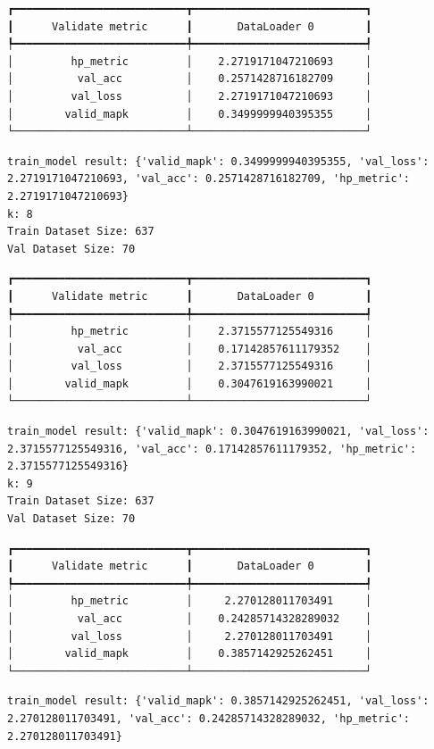 \documentclass[
  letterpaper,
  DIV=11,
  numbers=noendperiod]{scrreprt}
\begin{document}
\begin{verbatim}
┏━━━━━━━━━━━━━━━━━━━━━━━━━━━┳━━━━━━━━━━━━━━━━━━━━━━━━━━━┓
┃      Validate metric      ┃       DataLoader 0        ┃
┡━━━━━━━━━━━━━━━━━━━━━━━━━━━╇━━━━━━━━━━━━━━━━━━━━━━━━━━━┩
│         hp_metric         │    2.2719171047210693     │
│          val_acc          │    0.2571428716182709     │
│         val_loss          │    2.2719171047210693     │
│        valid_mapk         │    0.3499999940395355     │
└───────────────────────────┴───────────────────────────┘
\end{verbatim}

\begin{verbatim}
train_model result: {'valid_mapk': 0.3499999940395355, 'val_loss': 2.2719171047210693, 'val_acc': 0.2571428716182709, 'hp_metric': 2.2719171047210693}
k: 8
Train Dataset Size: 637
Val Dataset Size: 70
\end{verbatim}

\begin{verbatim}
┏━━━━━━━━━━━━━━━━━━━━━━━━━━━┳━━━━━━━━━━━━━━━━━━━━━━━━━━━┓
┃      Validate metric      ┃       DataLoader 0        ┃
┡━━━━━━━━━━━━━━━━━━━━━━━━━━━╇━━━━━━━━━━━━━━━━━━━━━━━━━━━┩
│         hp_metric         │    2.3715577125549316     │
│          val_acc          │    0.17142857611179352    │
│         val_loss          │    2.3715577125549316     │
│        valid_mapk         │    0.3047619163990021     │
└───────────────────────────┴───────────────────────────┘
\end{verbatim}

\begin{verbatim}
train_model result: {'valid_mapk': 0.3047619163990021, 'val_loss': 2.3715577125549316, 'val_acc': 0.17142857611179352, 'hp_metric': 2.3715577125549316}
k: 9
Train Dataset Size: 637
Val Dataset Size: 70
\end{verbatim}

\begin{verbatim}
┏━━━━━━━━━━━━━━━━━━━━━━━━━━━┳━━━━━━━━━━━━━━━━━━━━━━━━━━━┓
┃      Validate metric      ┃       DataLoader 0        ┃
┡━━━━━━━━━━━━━━━━━━━━━━━━━━━╇━━━━━━━━━━━━━━━━━━━━━━━━━━━┩
│         hp_metric         │     2.270128011703491     │
│          val_acc          │    0.24285714328289032    │
│         val_loss          │     2.270128011703491     │
│        valid_mapk         │    0.3857142925262451     │
└───────────────────────────┴───────────────────────────┘
\end{verbatim}

\begin{verbatim}
train_model result: {'valid_mapk': 0.3857142925262451, 'val_loss': 2.270128011703491, 'val_acc': 0.24285714328289032, 'hp_metric': 2.270128011703491}
\end{verbatim}
\end{document}
